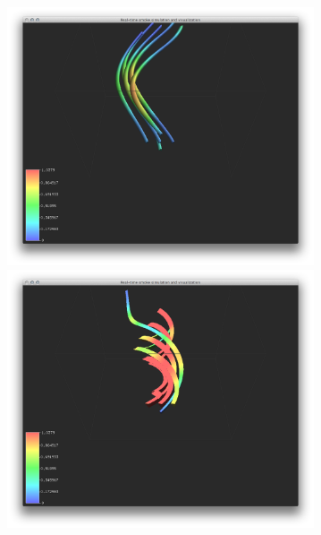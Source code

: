 \begin{figure}[htbp]
\centering
\begin{minipage}[t]{0.48\textwidth}
        \includegraphics[height=3in]{figures/streamtubes/40threeSegments.png}
\caption{}
\label{fig:}
\end{minipage}\hspace{.04\textwidth}%
\begin{minipage}[t]{0.48\textwidth}
        \includegraphics[height=3in]{figures/streamtubes/41flatshading.png}
    \caption{}
    \label{fig:}
\end{minipage}
\end{figure}

